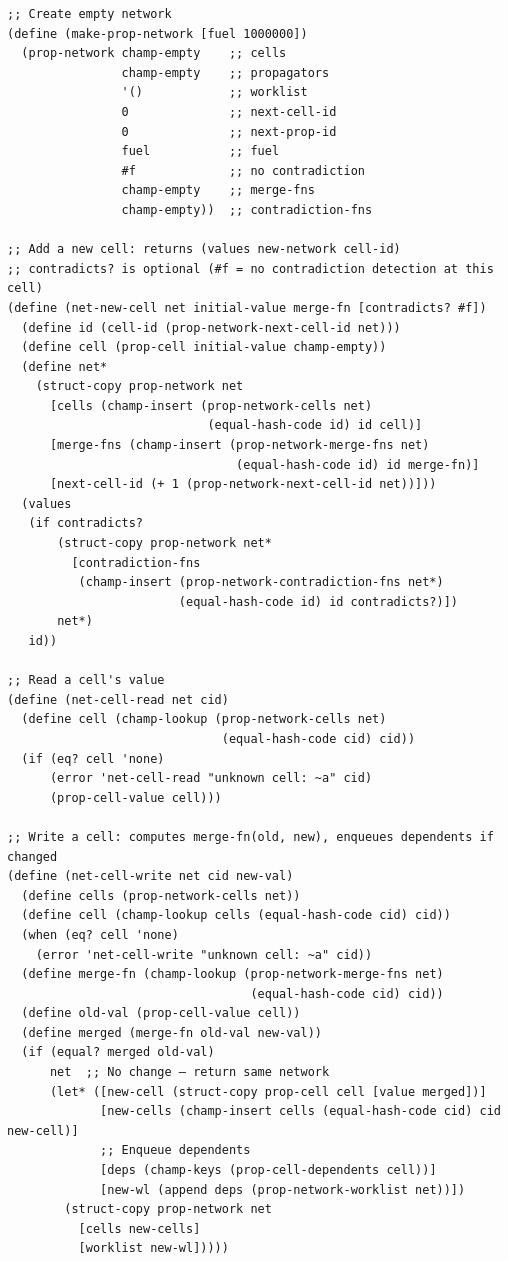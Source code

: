 \documentclass[11pt]{article}
\begin{document}
\begin{verbatim}
;; Create empty network
(define (make-prop-network [fuel 1000000])
  (prop-network champ-empty    ;; cells
                champ-empty    ;; propagators
                '()            ;; worklist
                0              ;; next-cell-id
                0              ;; next-prop-id
                fuel           ;; fuel
                #f             ;; no contradiction
                champ-empty    ;; merge-fns
                champ-empty))  ;; contradiction-fns

;; Add a new cell: returns (values new-network cell-id)
;; contradicts? is optional (#f = no contradiction detection at this cell)
(define (net-new-cell net initial-value merge-fn [contradicts? #f])
  (define id (cell-id (prop-network-next-cell-id net)))
  (define cell (prop-cell initial-value champ-empty))
  (define net*
    (struct-copy prop-network net
      [cells (champ-insert (prop-network-cells net)
                            (equal-hash-code id) id cell)]
      [merge-fns (champ-insert (prop-network-merge-fns net)
                                (equal-hash-code id) id merge-fn)]
      [next-cell-id (+ 1 (prop-network-next-cell-id net))]))
  (values
   (if contradicts?
       (struct-copy prop-network net*
         [contradiction-fns
          (champ-insert (prop-network-contradiction-fns net*)
                        (equal-hash-code id) id contradicts?)])
       net*)
   id))

;; Read a cell's value
(define (net-cell-read net cid)
  (define cell (champ-lookup (prop-network-cells net)
                              (equal-hash-code cid) cid))
  (if (eq? cell 'none)
      (error 'net-cell-read "unknown cell: ~a" cid)
      (prop-cell-value cell)))

;; Write a cell: computes merge-fn(old, new), enqueues dependents if changed
(define (net-cell-write net cid new-val)
  (define cells (prop-network-cells net))
  (define cell (champ-lookup cells (equal-hash-code cid) cid))
  (when (eq? cell 'none)
    (error 'net-cell-write "unknown cell: ~a" cid))
  (define merge-fn (champ-lookup (prop-network-merge-fns net)
                                  (equal-hash-code cid) cid))
  (define old-val (prop-cell-value cell))
  (define merged (merge-fn old-val new-val))
  (if (equal? merged old-val)
      net  ;; No change — return same network
      (let* ([new-cell (struct-copy prop-cell cell [value merged])]
             [new-cells (champ-insert cells (equal-hash-code cid) cid new-cell)]
             ;; Enqueue dependents
             [deps (champ-keys (prop-cell-dependents cell))]
             [new-wl (append deps (prop-network-worklist net))])
        (struct-copy prop-network net
          [cells new-cells]
          [worklist new-wl]))))


\end{verbatim}
\end{document}
